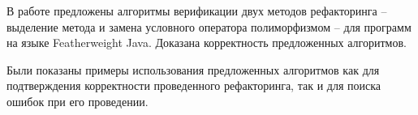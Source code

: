 \startconclusionpage
В работе предложены алгоритмы верификации двух методов рефакторинга -- выделение метода и замена условного оператора полиморфизмом --
для программ на языке Featherweight Java. Доказана корректность предложенных алгоритмов.

Были показаны примеры использования предложенных алгоритмов как для подтверждения корректности проведенного рефакторинга,
так и для поиска ошибок при его проведении.